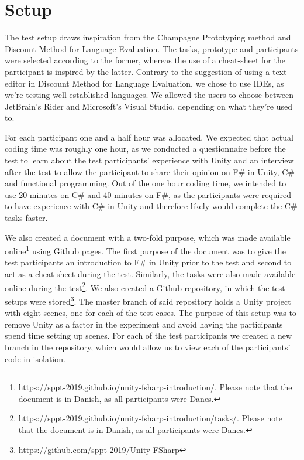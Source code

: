 \section{Setup}
The test setup draws inspiration from the Champagne Prototyping method and Discount Method for Language Evaluation. The tasks, prototype and participants were selected according to the former, whereas the use of a cheat-sheet for the participant is inspired by the latter. Contrary to the suggestion of using a text editor in Discount Method for Language Evaluation, we chose to use \glspl{IDE}, as we're testing well established languages. We allowed the users to choose between JetBrain's Rider and Microsoft's Visual Studio, depending on what they're used to.

For each participant one and a half hour was allocated. We expected that actual coding time was roughly one hour, as we conducted a questionnaire before the test to learn about the test participants' experience with Unity and an interview after the test to allow the participant to share their opinion on F\# in Unity, C\# and functional programming. Out of the one hour coding time, we intended to use 20 minutes on C\# and 40 minutes on F\#, as the participants were required to have experience with C\# in Unity and therefore likely would complete the C\# tasks faster.

We also created a document with a two-fold purpose, which was made available online\footnote{\url{https://sppt-2019.github.io/unity-fsharp-introduction/}. Please note that the document is in Danish, as all participants were Danes.} using Github pages. The first purpose of the document was to give the test participants an introduction to F\# in Unity prior to the test and second to act as a cheat-sheet during the test. Similarly, the tasks were also made available online during the test\footnote{\url{https://sppt-2019.github.io/unity-fsharp-introduction/tasks/}. Please note that the document is in Danish, as all participants were Danes.}. We also created a Github repository, in which the test-setups were stored\footnote{\url{https://github.com/sppt-2019/Unity-FSharp}}. The master branch of said repository holds a Unity project with eight scenes, one for each of the test cases. The purpose of this setup was to remove Unity as a factor in the experiment and avoid having the participants spend time setting up scenes. For each of the test participants we created a new branch in the repository, which would allow us to view each of the participants' code in isolation.

